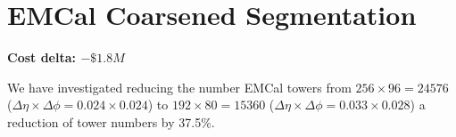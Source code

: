 \section*{EMCal Coarsened Segmentation}
\label{emcal_segmentation}

\textbf{Cost delta: $-\$1.8M$}

We have investigated reducing the number EMCal towers from
$256\times96=24576$ ($\Delta\eta\times\Delta\phi = 0.024 \times 0.024$) to
$192\times80 = 15360$ ($\Delta\eta\times\Delta\phi = 0.033 \times 0.028$) a
reduction of tower numbers by 37.5\%.
